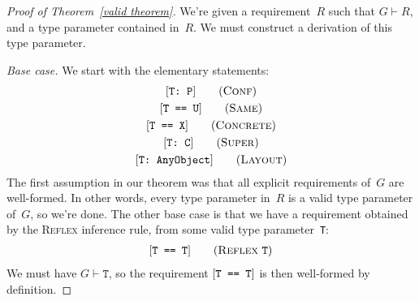 \documentclass[../generics]{subfiles}
\begin{document}
\begin{proof}[Proof of Theorem~\ref*{valid theorem}]
We're given a requirement~$R$ such that $G\vdash R$, and a type parameter contained in~$R$. We must construct a derivation of this type parameter.

\smallskip

\emph{Base case.} We start with the elementary statements:
\begin{gather*}
\ConfStepDef\\
\SameStepDef\\
\ConcreteStepDef\\
\SuperStepDef\\
\LayoutStepDef
\end{gather*}
The first assumption in our theorem was that all explicit requirements of~$G$ are well-formed. In other words, every type parameter in~$R$ is a valid type parameter of~$G$, so we're done. The other base case is that we have a requirement obtained by the \textsc{Reflex} inference rule, from some valid type parameter~\texttt{T}:
\begin{gather*}
\ReflexStepDef
\end{gather*}
We must have $G\vdash\texttt{T}$, so the requirement $[\texttt{T == T}]$ is then well-formed by definition.

\smallskip


\end{proof}
\end{document}
